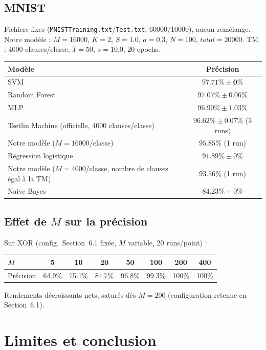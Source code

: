 \documentclass[12pt,a4paper]{article}
\begin{document}
\subsection{MNIST}
Fichiers fixes (\texttt{MNISTTraining.txt}/\texttt{Test.txt}, 60000/10000),
aucun remélange. Notre modèle : $M{=}16000$, $K{=}2$, $S{=}1.0$, $a{=}0.3$,
$N{=}100$, $total{=}20000$. TM : 4000 clauses/classe, $T{=}50$, $s{=}10.0$,
20 epochs.
\begin{center}
\begin{tabular}{lc}
\toprule
Modèle & Précision \\
\midrule
SVM & $\mathbf{97.71\%\pm0\%}$ \\
Random Forest & $97.07\%\pm0.06\%$ \\
MLP & $96.90\%\pm1.03\%$ \\
Tsetlin Machine (officielle, 4000 clauses/classe) & $96.62\%\pm0.07\%$ (3 runs) \\
Notre modèle ($M{=}16000$/classe) & $95.85\%$ (1 run) \\
Régression logistique & $91.89\%\pm0\%$ \\
Notre modèle ($M{=}4000$/classe, nombre de clauses égal à la TM) & $93.56\%$ (1 run) \\
Naive Bayes & $84.23\%\pm0\%$ \\
\bottomrule
\end{tabular}
\end{center}

\subsection{Effet de $M$ sur la précision}

Sur XOR (config.\ Section~6.1 fixée, $M$ variable, 20 runs/point) :
\begin{center}
\begin{tabular}{lccccccc}
\toprule
$M$ & 5 & 10 & 20 & 50 & 100 & 200 & 400 \\
\midrule
Précision & 64.9\% & 75.1\% & 84.7\% & 96.8\% & 99.3\% & 100\% & 100\% \\
\bottomrule
\end{tabular}
\end{center}
Rendements décroissants nets, saturés dès $M{=}200$ (configuration
retenue en Section~6.1). %

\section{Limites et conclusion}
\end{document}
